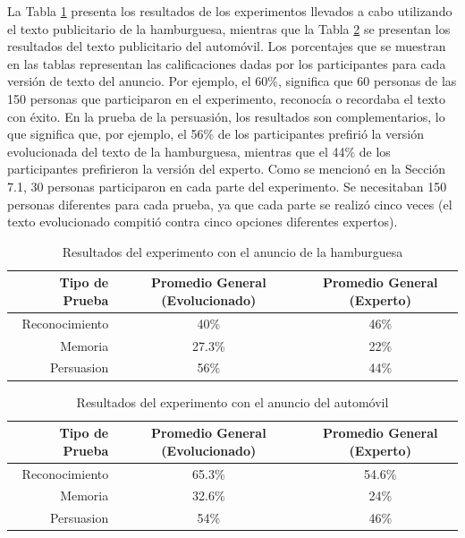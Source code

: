 La Tabla \ref{hamburgusa} presenta los resultados de los experimentos llevados a cabo utilizando el texto publicitario de la hamburguesa, mientras que la Tabla \ref{auto} se presentan los resultados del texto publicitario del automóvil.
Los porcentajes que se muestran en las tablas representan las calificaciones dadas por los participantes para cada versión de texto del anuncio. Por ejemplo,  el 60\%, significa que 60 personas de las 150 personas que participaron en el experimento, reconocía o recordaba el texto con éxito. En la prueba de la persuasión, los resultados son complementarios, lo que significa que, por ejemplo, el 56\% de los participantes prefirió la versión evolucionada del texto de la hamburguesa, mientras que el 44\% de los participantes prefirieron la versión del experto. 
Como se mencionó en la Sección 7.1, 30 personas participaron en cada parte del experimento. Se necesitaban 150 personas diferentes para cada prueba, ya que cada parte se realizó cinco veces (el texto evolucionado compitió contra cinco opciones diferentes expertos).

\begin{table}
\begin{center}
\begin{tabular}{|r|c|c|}
Tipo de Prueba & Promedio General (Evolucionado) & Promedio General (Experto) \\\hline \hline

Reconocimiento & 40\% & 46\% \\
Memoria & 27.3\% & 22\% \\
Persuasion & 56\% & 44\% \\

\end{tabular}
\end{center}
\caption{Resultados del experimento con el anuncio de la hamburguesa}
\label{hamburgusa}
\end{table}



\begin{table}
\begin{center}
\begin{tabular}{|r|c|c|}
Tipo de Prueba & Promedio General (Evolucionado) & Promedio General (Experto) \\\hline \hline

Reconocimiento & 65.3\% & 54.6\% \\
Memoria & 32.6\% & 24\% \\
Persuasion & 54\% & 46\% \\
\end{tabular}
\end{center}
\caption{Resultados del experimento con el anuncio del automóvil}
\label{auto}
\end{table}

